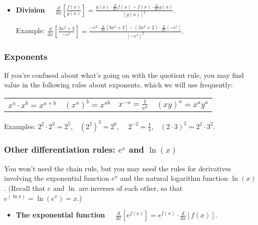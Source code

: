 \begin{CALCULUS}
\begin{itemize}
\medskip

\item \textbf{Division}\ \ \  $\displaystyle
\frac{d}{dx}\left[\frac{f(x)}{g(x)} \right] =
\frac{g(x)\cdot\frac{d}{dx}f(x) -
f(x)\cdot\frac{d}{dx}g(x)}{\left[ g(x)\right]^2}.$

\medskip

Example: $\displaystyle \frac{d}{dx}\left[\frac{3x^2+2}{-e^x}
\right] = \frac{-e^2\cdot\frac{d}{dx}[3x^2+2] -
(3x^2+2)\cdot\frac{d}{dx}[-e^x]}{\left[ -e^x\right]^2}.$
\end{itemize}

\subsubsection*{Exponents}

If you're confused about what's going on with the quotient rule, you may find value in the following rules about exponents, which we will use frequently:

\begin{center}
\begin{tabular}{cccc}
$x^a\cdot x^b = x^{a+b}$\hspace{.7cm} & $\left(x^a\right)^b =
x^{ab}$\hspace{.7cm} & $\displaystyle x^{-a} = \frac{1}{x^a}$
\hspace{.7cm} & $\displaystyle (xy)^a = x^a y^a$\hspace{.7cm}
\end{tabular}
\end{center}

\noindent Examples: $2^2 \cdot 2^3 = 2^5$,\ \ $(2^2)^3 = 2^6$, \ \
$2^{-2}=\frac{1}{4}$,\ \  $(2\cdot 3)^2 = 2^2\cdot 3^2$.


\subsubsection*{Other differentiation rules: $e^x$ and $\ln (x)$}

You won't need the chain rule, but you may need the rules for derivatives involving the exponential function $e^x$ and the natural logarithm function $\ln(x)$. (Recall that $e$ and $\ln$ are inverses of each other, so that $\displaystyle e^{(\ln x)} = \ln (e^x) = x$.)


\begin{itemize}
\item \textbf{The exponential function}\ \ \  $\displaystyle
\frac{d}{dx}\left[ e^{f(x)} \right] = e^{f(x)}\cdot
\frac{d}{dx}\left[ f(x)\right].$


\end{itemize}
\end{CALCULUS}
